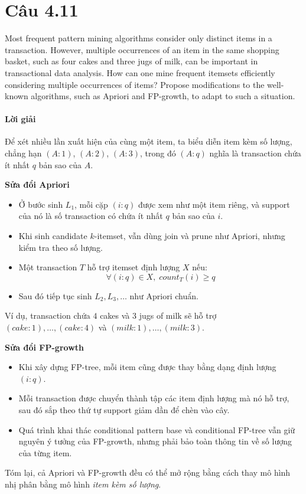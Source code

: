 \section{Câu 4.11}
Most frequent pattern mining algorithms consider only distinct items in a transaction. However, multiple occurrences of an item in the same shopping basket, such as four cakes and three jugs of milk, can be important in transactional data analysis. How can one mine frequent itemsets efficiently considering multiple occurrences of items? Propose modifications to the well-known algorithms, such as Apriori and FP-growth, to adapt to such a situation.

\paragraph{Lời giải}
Để xét nhiều lần xuất hiện của cùng một item, ta biểu diễn item kèm số lượng, chẳng hạn $(A{:}1)$, $(A{:}2)$, $(A{:}3)$, trong đó $(A{:}q)$ nghĩa là transaction chứa ít nhất $q$ bản sao của $A$.

\bigskip

\noindent \textbf{Sửa đổi Apriori}

\begin{itemize}
    \item Ở bước sinh $L_1$, mỗi cặp $(i{:}q)$ được xem như một item riêng, và support của nó là số transaction có chứa ít nhất $q$ bản sao của $i$.
    \item Khi sinh candidate $k$-itemset, vẫn dùng join và prune như Apriori, nhưng kiểm tra theo số lượng.
    \item Một transaction $T$ hỗ trợ itemset định lượng $X$ nếu:
          \[
              \forall (i{:}q)\in X,\; count_T(i)\ge q
          \]
    \item Sau đó tiếp tục sinh $L_2,L_3,\dots$ như Apriori chuẩn.
\end{itemize}

Ví dụ, transaction chứa $4$ cakes và $3$ jugs of milk sẽ hỗ trợ $(cake{:}1),\dots,(cake{:}4)$ và $(milk{:}1),\dots,(milk{:}3)$.

\bigskip

\noindent \textbf{Sửa đổi FP-growth}

\begin{itemize}
    \item Khi xây dựng FP-tree, mỗi item cũng được thay bằng dạng định lượng $(i{:}q)$.
    \item Mỗi transaction được chuyển thành tập các item định lượng mà nó hỗ trợ, sau đó sắp theo thứ tự support giảm dần để chèn vào cây.
    \item Quá trình khai thác conditional pattern base và conditional FP-tree vẫn giữ nguyên ý tưởng của FP-growth, nhưng phải bảo toàn thông tin về số lượng của từng item.
\end{itemize}

Tóm lại, cả Apriori và FP-growth đều có thể mở rộng bằng cách thay mô hình nhị phân bằng mô hình \textit{item kèm số lượng}.
